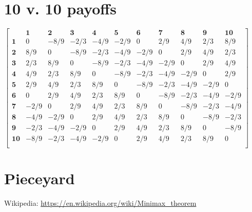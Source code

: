 \documentclass[11pt, oneside]{article} 	%
\begin{document}
\section{10 v. 10 payoffs}

\setcounter{MaxMatrixCols}{20}

$\begin{bmatrix}
& \mathbf{1} & \mathbf{2}  & \mathbf{3} & \mathbf{4} & \mathbf{5} & \mathbf{6}  &\mathbf{7}  & \mathbf{8} &\mathbf{9}  & \mathbf{10} \\  
\mathbf{1} & 0 & -8/9 & -2/3 & -4/9 & -2/9 & 0 & 2/9 & 4/9 & 2/3 & 8/9 \\
\mathbf{2} & 8/9 & 0 & -8/9 & -2/3 & -4/9 & -2/9 & 0 & 2/9 & 4/9 & 2/3 \\
\mathbf{3} & 2/3 & 8/9 & 0 & -8/9 & -2/3 & -4/9 & -2/9 & 0 & 2/9 & 4/9 \\
\mathbf{4} & 4/9 & 2/3 & 8/9 & 0 & -8/9 & -2/3 & -4/9 & -2/9 & 0 & 2/9 \\
\mathbf{5} & 2/9 & 4/9 & 2/3 & 8/9 & 0 & -8/9 & -2/3 & -4/9 & -2/9 & 0 \\
\mathbf{6} & 0 & 2/9 & 4/9 & 2/3 & 8/9 & 0 & -8/9 & -2/3 & -4/9 & -2/9 \\
\mathbf{7} & -2/9 & 0 & 2/9 & 4/9 & 2/3 & 8/9 & 0 & -8/9 & -2/3 & -4/9 \\
\mathbf{8} & -4/9 & -2/9 & 0 & 2/9 & 4/9 & 2/3 & 8/9 & 0 & -8/9 & -2/3 \\
\mathbf{9} & -2/3 & -4/9 & -2/9 & 0 & 2/9 & 4/9 & 2/3 & 8/9 & 0 & -8/9 \\
\mathbf{10} & -8/9 & -2/3 & -4/9 & -2/9 & 0 & 2/9 & 4/9 & 2/3 & 8/9 & 0 \\
\end{bmatrix}
$


\section{Pieceyard}


\begin{thebibliography}{9}
Wikipedia: \url{https://en.wikipedia.org/wiki/Minimax_theorem}
\end{thebibliography}
\end{document}
